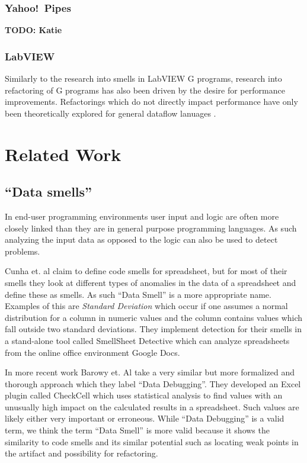 \documentclass[10pt,conference,compsocconf]{IEEEtran}
\newcommand{\todo}[1]{\textbf{TODO: #1}}
\begin{document}
\subsubsection{Yahoo!\ Pipes}
\todo{Katie}

\subsubsection{LabVIEW}

Similarly to the research into smells in LabVIEW G programs, research into refactoring of G programs has also been driven by the desire for performance improvements. Refactorings which do not directly impact performance have only been theoretically explored for general dataflow lanuages \cite{sui2008automated}.

\section{Related Work}
\label{sec:related_work}

\subsection{``Data smells''}
\label{subsec:related_datasmells}

In end-user programming environments user input and logic are often more closely linked than they are in general purpose programming languages.
As such analyzing the input data as opposed to the logic can also be used to detect problems.

Cunha et. al \cite{cunha2012towards} claim to define code smells for spreadsheet, but for most of their smells they look at different types of anomalies in the data of a spreadsheet and define these as smells.
As such ``Data Smell'' is a more appropriate name.
Examples of this are \textit{Standard Deviation} which occur if one assumes a normal distribution for a column in numeric values and the column contains values which fall outside two standard deviations.
They implement detection for their smells in a stand-alone tool called SmellSheet Detective which can analyze spreadsheets from the online office environment Google Docs.

In more recent work Barowy et. Al \cite{barowy2014checkcell} take a very similar but more formalized and thorough approach which they label ``Data Debugging''.
They developed an Excel plugin called CheckCell which uses statistical analysis to find values with an unusually high impact on the calculated results in a spreadsheet.
Such values are likely either very important or erroneous.
While ``Data Debugging'' is a valid term, we think the term ``Data Smell'' is more valid because it shows the similarity to code smells and its similar potential such as locating weak points in the artifact and possibility for refactoring.
\end{document}
